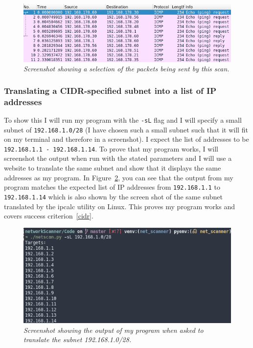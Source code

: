 \documentclass[titlepage]{article}
\let\Oldsubsubsection\subsubsection{}
\renewcommand{\subsubsection}{\FloatBarrier\Oldsubsubsection}
\begin{document}
\begin{figure}[H]
  \centering
  \includegraphics[width=\textwidth]{pingscantest_Wireshark.png}
  \caption{\textit{%
    Screenshot showing a selection of the packets being sent by this scan.
}}\label{lanscanWireshark}
\end{figure}

\subsubsection{Translating a CIDR-specified subnet into a list of IP addresses}
To show this I will run my program with the \verb|-sL| flag and I will specify
a small subnet of \verb|192.168.1.0/28| (I have chosen such a small subnet
such that it will fit on my terminal and therefore in a screenshot).
I expect the list of addresses to be \verb|192.168.1.1 - 192.168.1.14|.
To prove that my program works,
I will screenshot the output when run with the stated parameters and I will use
a website to translate the same subnet and show
that it displays the same addresses as my program.
In Figure~\ref{cidrtest}, you can see that the output from my program matches
the expected list of IP addresses from \verb|192.168.1.1| to \verb|192.168.1.14|
which is also shown by the screen shot of the same subnet translated by
the ipcalc utility on Linux.
This proves my program works and covers success criterion~\ref{cidr}.

\begin{figure}[H]
  \centering
  \includegraphics[width=\textwidth]{iplist.png}
  \caption{\textit{%
    Screenshot showing the output of my program when asked to translate the subnet 192.168.1.0/28.
}}\label{cidrtest}
\end{figure}
\end{document}
